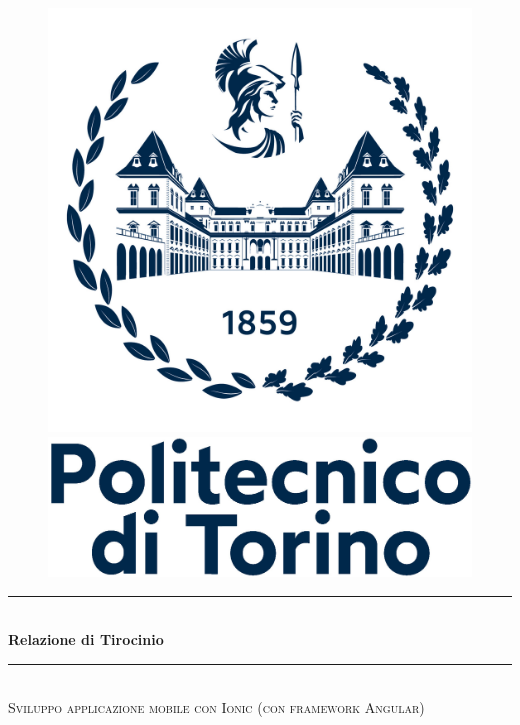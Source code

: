 \documentclass[../main.tex]{subfiles}
\begin{document}
    \begin{titlepage}
        \center

        \begin{figure}[h!]
            \centering
            \includegraphics[width=.5\linewidth]{src/img/logo1.jpg} \\
            \includegraphics[width=.5\linewidth]{src/img/logo2.jpg} \\
        \end{figure}

        \vspace*{2em}

        \rule{\linewidth}{.1em}
        \\[1em]
        {\huge\bfseries Relazione di Tirocinio}
        \\[.33em]
        \rule{\linewidth}{.1em}
        \\[1em]
        \textsc{
            \large Sviluppo applicazione mobile con Ionic
                (con framework Angular)
        }

        \vfill


\end{titlepage}
\end{document}
